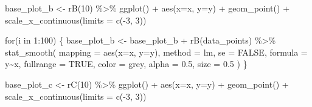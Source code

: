 \documentclass[
  letterpaper,
  DIV=11,
  numbers=noendperiod]{scrreprt}
\newenvironment{Shaded}{\begin{snugshade}}{\end{snugshade}}
\newcommand{\AttributeTok}[1]{\textcolor[rgb]{0.40,0.45,0.13}{#1}}
\newcommand{\ConstantTok}[1]{\textcolor[rgb]{0.56,0.35,0.01}{#1}}
\newcommand{\ControlFlowTok}[1]{\textcolor[rgb]{0.00,0.23,0.31}{#1}}
\newcommand{\DecValTok}[1]{\textcolor[rgb]{0.68,0.00,0.00}{#1}}
\newcommand{\FloatTok}[1]{\textcolor[rgb]{0.68,0.00,0.00}{#1}}
\newcommand{\FunctionTok}[1]{\textcolor[rgb]{0.28,0.35,0.67}{#1}}
\newcommand{\NormalTok}[1]{\textcolor[rgb]{0.00,0.23,0.31}{#1}}
\newcommand{\OtherTok}[1]{\textcolor[rgb]{0.00,0.23,0.31}{#1}}
\newcommand{\SpecialCharTok}[1]{\textcolor[rgb]{0.37,0.37,0.37}{#1}}
\newcommand{\StringTok}[1]{\textcolor[rgb]{0.13,0.47,0.30}{#1}}
\begin{document}
\begin{Shaded}
\begin{Highlighting}[]
\NormalTok{base\_plot\_b }\OtherTok{\textless{}{-}} \FunctionTok{rB}\NormalTok{(}\DecValTok{10}\NormalTok{) }\SpecialCharTok{\%\textgreater{}\%}  
  \FunctionTok{ggplot}\NormalTok{() }\SpecialCharTok{+} 
  \FunctionTok{aes}\NormalTok{(}\AttributeTok{x=}\NormalTok{x, }\AttributeTok{y=}\NormalTok{y) }\SpecialCharTok{+} 
  \FunctionTok{geom\_point}\NormalTok{() }\SpecialCharTok{+} 
  \FunctionTok{scale\_x\_continuous}\NormalTok{(}\AttributeTok{limits =} \FunctionTok{c}\NormalTok{(}\SpecialCharTok{{-}}\DecValTok{3}\NormalTok{, }\DecValTok{3}\NormalTok{))}

\ControlFlowTok{for}\NormalTok{(i }\ControlFlowTok{in} \DecValTok{1}\SpecialCharTok{:}\DecValTok{100}\NormalTok{) \{ }
\NormalTok{    base\_plot\_b }\OtherTok{\textless{}{-}}\NormalTok{ base\_plot\_b }\SpecialCharTok{+} \FunctionTok{rB}\NormalTok{(data\_points) }\SpecialCharTok{\%\textgreater{}\%} 
      \FunctionTok{stat\_smooth}\NormalTok{(}
        \AttributeTok{mapping =} \FunctionTok{aes}\NormalTok{(}\AttributeTok{x=}\NormalTok{x, }\AttributeTok{y=}\NormalTok{y), }
        \AttributeTok{method  =} \StringTok{\textquotesingle{}lm\textquotesingle{}}\NormalTok{,         }\AttributeTok{se =} \ConstantTok{FALSE}\NormalTok{, }
        \AttributeTok{formula =} \StringTok{\textquotesingle{}y\textasciitilde{}x\textquotesingle{}}\NormalTok{, }\AttributeTok{fullrange =} \ConstantTok{TRUE}\NormalTok{,}
        \AttributeTok{color   =} \StringTok{\textquotesingle{}grey\textquotesingle{}}\NormalTok{,    }\AttributeTok{alpha =} \FloatTok{0.5}\NormalTok{,}
        \AttributeTok{size    =} \FloatTok{0.5}
\NormalTok{      )}
\NormalTok{  \}}

\NormalTok{base\_plot\_c }\OtherTok{\textless{}{-}} \FunctionTok{rC}\NormalTok{(}\DecValTok{10}\NormalTok{) }\SpecialCharTok{\%\textgreater{}\%}  
  \FunctionTok{ggplot}\NormalTok{() }\SpecialCharTok{+} 
  \FunctionTok{aes}\NormalTok{(}\AttributeTok{x=}\NormalTok{x, }\AttributeTok{y=}\NormalTok{y) }\SpecialCharTok{+} 
  \FunctionTok{geom\_point}\NormalTok{() }\SpecialCharTok{+} 
  \FunctionTok{scale\_x\_continuous}\NormalTok{(}\AttributeTok{limits =} \FunctionTok{c}\NormalTok{(}\SpecialCharTok{{-}}\DecValTok{3}\NormalTok{, }\DecValTok{3}\NormalTok{))}


\end{Highlighting}
\end{Shaded}
\end{document}
